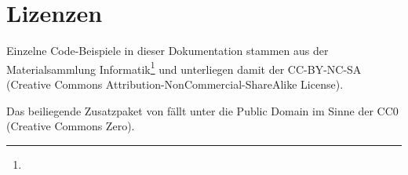 \section{Lizenzen}
	\license
	
	Einzelne Code-Beispiele in dieser Dokumentation stammen aus der Materialsammlung Informatik\footnote{\materialsammlung} und unterliegen damit der CC-BY-NC-SA (Creative Commons Attribution-NonCommercial-ShareAlike License).
	
	Das beiliegende Zusatzpaket  von  fällt unter die Public Domain im Sinne der CC0 (Creative Commons Zero).
